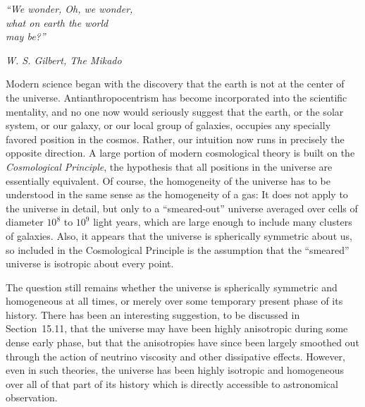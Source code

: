 
\begin{flushleft}
\begin{minipage}{0.35\textwidth}
\raggedright
\itshape
``We wonder, Oh, we wonder,\\
what on earth the world\\
may be?''

\medskip
\upshape
\textit{W. S. Gilbert, The Mikado}
\end{minipage}
\end{flushleft}

Modern science began with the discovery that the earth is not at the center of
the universe. Antianthropocentrism has become incorporated into the scientific
mentality, and no one now would seriously suggest that the earth, or the solar
system, or our galaxy, or our local group of galaxies, occupies any specially
favored position in the cosmos. Rather, our intuition now runs in precisely the
opposite direction. A large portion of modern cosmological theory is built on
the \emph{Cosmological Principle}, the hypothesis that all positions in the
universe are essentially equivalent. Of course, the homogeneity of the universe
has to be understood in the same sense as the homogeneity of a gas: It does not
apply to the universe in detail, but only to a ``smeared-out'' universe averaged
over cells of diameter \(10^8\) to \(10^9\) light years, which are large enough
to include many clusters of galaxies. Also, it appears that the universe is
spherically symmetric about us, so included in the Cosmological Principle is
the assumption that the ``smeared'' universe is isotropic about every point.

The question still remains whether the universe is spherically symmetric and
homogeneous at all times, or merely over some temporary present phase of its
history. There has been an interesting suggestion, to be discussed in
Section~15.11, that the universe may have been highly anisotropic during some
dense early phase, but that the anisotropies have since been largely smoothed
out through the action of neutrino viscosity and other dissipative effects.
However, even in such theories, the universe has been highly isotropic and
homogeneous over all of that part of its history which is directly accessible
to astronomical observation.

